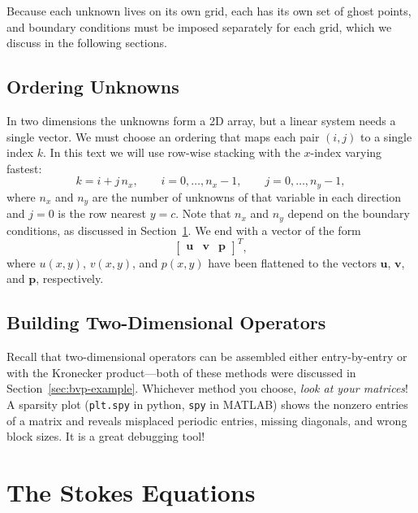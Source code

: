 Because each unknown lives on its own grid, each has its own set of ghost points, and boundary conditions must be imposed separately for each grid, which we discuss in the following sections.


\subsection{Ordering Unknowns}
\label{sec:stg-order}

In two dimensions the unknowns form a 2D array, but a linear system needs a single vector. We must choose an ordering that maps each pair $(i,j)$ to a single index $k$. In this text we will use row-wise stacking with the $x$-index varying fastest:
\begin{equation}
    k = i + j\,n_x, \qquad i = 0,\dots,n_x-1, \qquad j = 0,\dots,n_y-1,
    \label{eq:stg-order}
\end{equation}
where $n_x$ and $n_y$ are the number of unknowns of that variable in each direction and $j=0$ is the row nearest $y=c$. Note that $n_x$ and $n_y$ depend on the boundary conditions, as discussed in Section~\ref{sec:stokes}. We end with a vector of the form
\begin{equation}
\begin{bmatrix}
\mathbf{u} & \mathbf{v} & \mathbf{p}
\end{bmatrix}^T, \label{eq:unknowns}
\end{equation}
where $u(x,y)$, $v(x,y)$, and $p(x,y)$ have been flattened to the vectors $\mathbf{u}$, $\mathbf{v}$, and $\mathbf{p}$, respectively.


\subsection{Building Two-Dimensional Operators}
\label{sec:stg-kron}

Recall that two-dimensional operators can be assembled either entry-by-entry or with the Kronecker product---both of these methods were discussed in Section~\ref{sec:bvp-example}. Whichever method you choose, \emph{look at your matrices}! A sparsity plot (\lstinline|plt.spy| in python, \lstinline|spy| in MATLAB) shows the nonzero entries of a matrix and reveals misplaced periodic entries, missing diagonals, and wrong block sizes. It is a great debugging tool!


\section{The Stokes Equations}
\label{sec:stokes}


